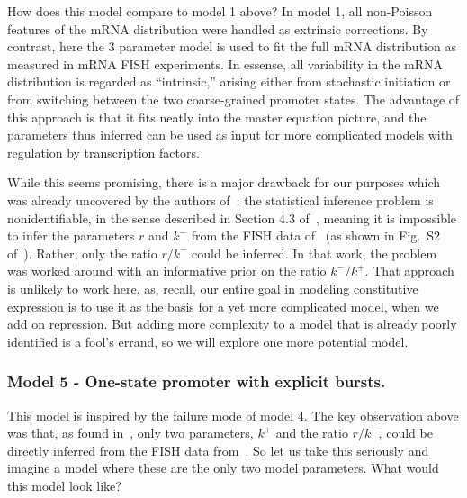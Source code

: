 How does this model compare to model 1 above? In model 1, all non-Poisson
features of the mRNA distribution were handled as extrinsic corrections. By
contrast, here the 3 parameter model is used to fit the full mRNA distribution
as measured in mRNA FISH experiments. In essense, all variability in the mRNA
distribution is regarded as ``intrinsic,'' arising either from stochastic
initiation or from switching between the two coarse-grained promoter states. The
advantage of this approach is that it fits neatly into the master equation
picture, and the parameters thus inferred can be used as input for more
complicated models with regulation by transcription factors.

While this seems promising, there is a major drawback for our purposes which was
already uncovered by the authors of~\cite{Razo-Mejia2020}: the statistical
inference problem is nonidentifiable, in the sense described in Section 4.3
of~\cite{Gelman2013}, meaning it is impossible to infer the parameters $r$ and
$k^-$ from the FISH data of~\cite{Jones2014} (as shown in Fig.~S2
of~\cite{Razo-Mejia2020}). Rather, only the ratio $r/k^-$ could be inferred. In
that work, the problem was worked around with an informative prior on the ratio
$k^-/k^+$. That approach is unlikely to work here, as, recall, our entire goal
in modeling constitutive expression is to use it as the basis for a yet more
complicated model, when we add on repression. But adding more complexity to a
model that is already poorly identified is a fool's errand, so we will explore
one more potential model.

\subsubsection{Model 5 - One-state promoter with explicit bursts.}
This model is inspired by the failure mode of model 4. The key observation above
was that, as found in~\cite{Razo-Mejia2020}, only two parameters, $k^+$ and the
ratio $r/k^-$, could be directly inferred from the FISH data
from~\cite{Jones2014}. So let us take this seriously and imagine a model where
these are the only two model parameters. What would this model look like?

